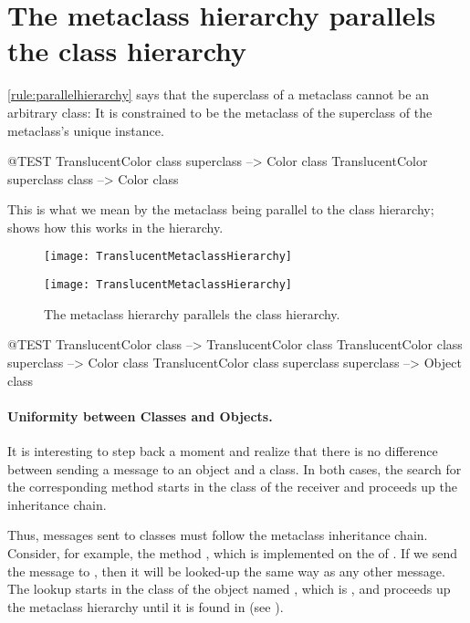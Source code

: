 \documentclass[a4paper,10pt,twoside]{book}
\begin{document}
\section{The metaclass hierarchy parallels the class hierarchy}

\ref{rule:parallelhierarchy} says that the superclass of a metaclass cannot be an arbitrary class:
It is constrained to be the metaclass of the superclass of the metaclass's unique instance.

\begin{code}{@TEST}
TranslucentColor class superclass --> Color class
TranslucentColor superclass class --> Color class
\end{code}

\noindent
This is what we mean by the metaclass  being parallel to the class hierarchy;  shows how this works in the  hierarchy.

\begin{center}
\begin{figure}[!ht]
\ifluluelse
	{\centerline {\texttt{[image: TranslucentMetaclassHierarchy]}}}
	{\centerline {\texttt{[image: TranslucentMetaclassHierarchy]}}}
\caption{The metaclass hierarchy parallels the class hierarchy.\label{fig:parallelHierarchies}}
\end{figure}
\end{center}

\begin{code}{@TEST}
TranslucentColor class                                     --> TranslucentColor class
TranslucentColor class superclass                   --> Color class
TranslucentColor class superclass superclass --> Object class
\end{code}

\paragraph{Uniformity between Classes and Objects.}
It is interesting to step back a moment and realize that there is no difference between sending a message to an object and a class. 
In both cases, the search for the corresponding method starts in the class of the receiver and proceeds up the inheritance chain.

Thus, messages sent to classes must follow the metaclass inheritance chain.
Consider, for example, the method , which is implemented on the  of .
If we send the message  to , then it will be looked-up the same way as any other message.
The lookup starts in the class of the object named , which is , and proceeds up the metaclass hierarchy until it is found in  (see ).
\end{document}

